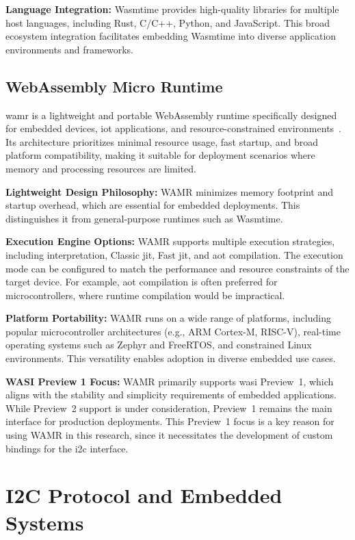 \textbf{Language Integration:} Wasmtime provides high-quality libraries for multiple host languages, including Rust, C/C++, Python, and JavaScript. This broad ecosystem integration facilitates embedding Wasmtime into diverse application environments and frameworks.

\subsection{WebAssembly Micro Runtime}
\label{subsec:wamr}

\acrfull{wamr} is a lightweight and portable WebAssembly runtime specifically designed for embedded devices, \acrshort{iot} applications, and resource-constrained environments~\cite{wamr_project, wamr_project2}. Its architecture prioritizes minimal resource usage, fast startup, and broad platform compatibility, making it suitable for deployment scenarios where memory and processing resources are limited.

\textbf{Lightweight Design Philosophy:} WAMR minimizes memory footprint and startup overhead, which are essential for embedded deployments. This distinguishes it from general-purpose runtimes such as Wasmtime.

\textbf{Execution Engine Options:} WAMR supports multiple execution strategies, including interpretation, Classic \acrshort{jit}, Fast \acrshort{jit}, and \acrshort{aot} compilation. The execution mode can be configured to match the performance and resource constraints of the target device. For example, \acrshort{aot} compilation is often preferred for microcontrollers, where runtime compilation would be impractical.

\textbf{Platform Portability:} WAMR runs on a wide range of platforms, including popular microcontroller architectures (e.g., ARM Cortex-M, RISC-V), real-time operating systems such as Zephyr and FreeRTOS, and constrained Linux environments. This versatility enables adoption in diverse embedded use cases.

\textbf{WASI Preview 1 Focus:} WAMR primarily supports \acrshort{wasi} Preview~1, which aligns with the stability and simplicity requirements of embedded applications. While Preview~2 support is under consideration, Preview~1 remains the main interface for production deployments. This Preview~1 focus is a key reason for using WAMR in this research, since it necessitates the development of custom bindings for the \acrshort{i2c} interface.


\section{I2C Protocol and Embedded Systems}
\label{sec:i2c-embedded}

